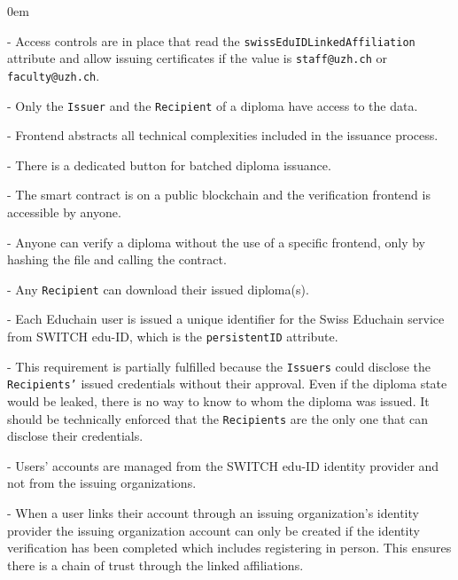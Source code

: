 \begin{description}[leftmargin=40pt]
	\itemsep0em
	\item[RQ01] - Access controls are in place that read the \texttt{swissEduIDLinkedAffiliation} attribute and allow issuing certificates if the value is \texttt{staff@uzh.ch} or \texttt{faculty@uzh.ch}.
	
	\item[RQ02] - Only the \texttt{Issuer} and the \texttt{Recipient} of a diploma have access to the data.
	
	\item[RQ03] - Frontend abstracts all technical complexities included in the issuance process.
	
	\item[RQ04] - There is a dedicated button for batched diploma issuance.
	
	\item[RQ05] - The smart contract is on a public blockchain and the verification frontend is accessible by anyone.
	
	\item[RQ06] - Anyone can verify a diploma without the use of a specific frontend, only by hashing the file and calling the contract.
	
	\item[RQ07] - Any \texttt{Recipient} can download their issued diploma(s).
	
	\item[RQ08] - Each Educhain user is issued a unique identifier for the Swiss Educhain service from SWITCH edu-ID, which is the \texttt{persistentID} attribute.
	
	\item[RQ09] - This requirement is partially fulfilled because the \texttt{Issuers} could disclose the \texttt{Recipients'} issued credentials without their approval. Even if the diploma state would be leaked, there is no way to know to whom the diploma was issued. It should be technically enforced that the \texttt{Recipients} are the only one that can disclose their credentials.
	
	\item[RQ10] - Users' accounts are managed from the SWITCH edu-ID identity provider and not from the issuing organizations.
	
	\item[RQ11] - When a user links their account through an issuing organization's identity provider the issuing organization account can only be created if the identity verification has been completed which includes registering in person. This ensures there is a chain of trust through the linked affiliations.
	

\end{description}
